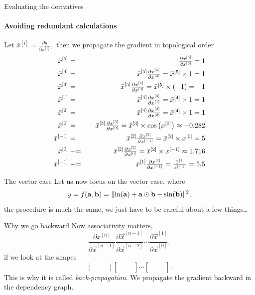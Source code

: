\documentclass[noamsthm]{beamer}
\begin{document}
\begingroup
\renewcommand{\partialfrac}[2]{\textstyle\frac{\partial#1}{\partial#2}}
\begin{frame}{Evaluating the derivatives}
\framesubtitle{Avoiding redundant calculations}
Let \(\bar x^{[i]} = \partialfrac y {x^{[i]}},\) then we propagate the gradient in topological order
\begin{eqnarray*}
\bar x^{[5]}    &=& \partialfrac{x^{[5]}}{x^{[5]}} = 1 \\
\bar x^{[4]}    &=& \bar x^{[5]}\partialfrac{x^{[5]}}{x^{[4]}}
    = \bar x^{[5]} \times 1 = 1 \\
\bar x^{[3]}    &=& \bar x^{[5]}\partialfrac{x^{[5]}}{x^{[3]}}
    = \bar x^{[5]} \times (-1) = -1 \\
\bar x^{[1]}    &=& \bar x^{[4]}\partialfrac{x^{[4]}}{x^{[1]}}
    = \bar x^{[4]} \times 1 = 1 \\
\bar x^{[2]}    &=& \bar x^{[4]}\partialfrac{x^{[4]}}{x^{[2]}}
    = \bar x^{[4]} \times 1 = 1 \\
\bar x^{[0]}    &=& \bar x^{[3]}\partialfrac{x^{[3]}}{x^{[0]}}
    = \bar x^{[3]} \times \cos\left(x^{[0]}\right) \approx -0.282 \\
\bar x^{[-1]} &=& \bar x^{[2]}\partialfrac{x^{[2]}}{x^{[-1]}}
    = \bar x^{[2]} \times x^{[0]} = 5 \\
\bar x^{[0]}    &\pluseq\phantom+& \bar x^{[2]}\partialfrac{x^{[2]}}{x^{[0]}}
    = \bar x^{[2]} \times x^{[-1]} \approx 1.716 \\
\bar x^{[-1]} &\pluseq\phantom+& \bar x^{[1]}\partialfrac{x^{[1]}}{x^{[-1]}}
    = \frac{\bar x^{[1]}}{x^{[-1]}} = 5.5
\end{eqnarray*}
\end{frame}
\endgroup

\begin{frame}{The vector case}
Let us now focus on the vector case, where \[y = f(\mathbf{a},\mathbf{b}) = \Vert\!\ln(\mathbf{a}) + \mathbf{a} \odot \mathbf{b} - \sin(\mathbf{b})\Vert^2,\]
the procedure is much the same, we just have to be careful about a few things\dots
\end{frame}

\begingroup
\renewcommand\matrix{\left[\begin{array}{ccc}&&\\&&\\&&\end{array}\right]}
\renewcommand\vector{\left[\begin{array}{ccc}&&\end{array}\right]}
\begin{frame}{Why we go backward}
Now associativity matters,
\[\partialfrac{x^{[n]}}{\vec x^{[n-1]}} \partialfrac{\vec x^{[n-1]}}{\vec x^{[n-2]}}
\cdots \partialfrac{\vec x^{[1]}}{\vec x^{[0]}},\]
if we look at the shapes
\[\vector \matrix \cdots \matrix\!\!.\]
This is why it is called \emph{back-propagation}. We propagate the gradient
backward in the dependency graph.
\end{frame}
\endgroup
\end{document}
